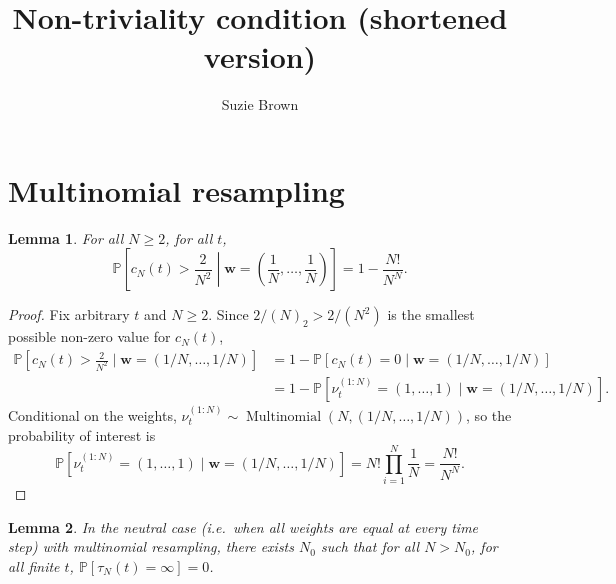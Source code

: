 \documentclass{article}
\title{Non-triviality condition (shortened version)}
\author{Suzie Brown}
\newtheorem{lemma}{Lemma}
\newcommand{\PR}{\mathbb{P}}
\newcommand{\Mn}{\operatorname{Multinomial}}
\begin{document}
\maketitle
\thispagestyle{fancy}

\section*{Multinomial resampling}

\begin{lemma}\label{lem:neutral_cN_LB}
For all $N\geq 2$, for all $t$,
\begin{equation*}
\PR \left[c_N(t) > \frac{2}{N^2} \middle| \mathbf{w}=\left( \frac{1}{N}, \dots, \frac{1}{N} \right) \right] 
= 1- \frac{N!}{N^N}.
\end{equation*}
\end{lemma}

\begin{proof}
Fix arbitrary $t$ and $N\geq 2$. Since $2/(N)_2 > 2/(N^2)$ is the smallest possible non-zero value for $c_N(t)$,
\begin{align*}
\PR \left[c_N(t) > \frac{2}{N^2} \mid \mathbf{w}=(1/N, \dots, 1/N) \right]
&= 1- \PR[c_N(t) = 0  \mid \mathbf{w}=(1/N, \dots, 1/N)] \\
&= 1- \PR[\nu_t^{(1:N)} = (1,\dots, 1) \mid \mathbf{w}=(1/N, \dots, 1/N)].
\end{align*}
Conditional on the weights, $\nu_t^{(1:N)} \sim \Mn(N, (1/N, \dots, 1/N))$, so the probability of interest is
\begin{equation*}
\PR[\nu_t^{(1:N)} = (1,\dots, 1) \mid \mathbf{w}=(1/N, \dots, 1/N)] =
N! \prod_{i=1}^N \frac{1}{N}
= \frac{N!}{N^N}.
\end{equation*}
\end{proof}


\begin{lemma}\label{thm:nontrivial_mn_optimalw}
In the neutral case (i.e.\ when all weights are equal at every time step) with multinomial resampling, there exists $N_0$ such that for all $N>N_0$, for all finite $t$, $\PR[\tau_N(t) = \infty] =0$.
\end{lemma}
\end{document}
